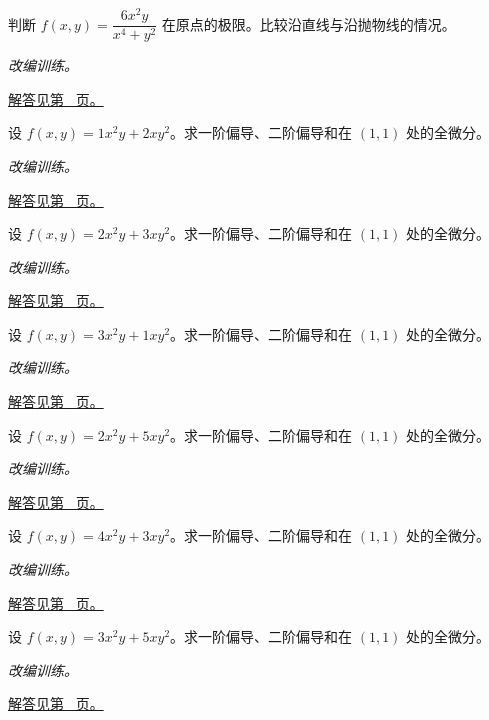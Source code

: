 \documentclass[UTF8,12pt,a4paper,fontset=fandol]{ctexart}
\begin{document}
\begin{example}[直线路径一致仍可能无极限]\label{ex:c32q13}
判断 $f(x,y)=\dfrac{6x^2y}{x^4+y^2}$ 在原点的极限。比较沿直线与沿抛物线的情况。
\par\textit{改编训练。}\par\hyperref[ans:c32q13]{解答见第~\pageref{ans:c32q13} 页。}
\end{example}
\begin{example}[二元多项式的偏导与全微分]\label{ex:c32q14}
设 $f(x,y)=1x^2y+2xy^2$。求一阶偏导、二阶偏导和在 $(1,1)$ 处的全微分。
\par\textit{改编训练。}\par\hyperref[ans:c32q14]{解答见第~\pageref{ans:c32q14} 页。}
\end{example}
\begin{example}[二元多项式的偏导与全微分]\label{ex:c32q15}
设 $f(x,y)=2x^2y+3xy^2$。求一阶偏导、二阶偏导和在 $(1,1)$ 处的全微分。
\par\textit{改编训练。}\par\hyperref[ans:c32q15]{解答见第~\pageref{ans:c32q15} 页。}
\end{example}
\begin{example}[二元多项式的偏导与全微分]\label{ex:c32q16}
设 $f(x,y)=3x^2y+1xy^2$。求一阶偏导、二阶偏导和在 $(1,1)$ 处的全微分。
\par\textit{改编训练。}\par\hyperref[ans:c32q16]{解答见第~\pageref{ans:c32q16} 页。}
\end{example}
\begin{example}[二元多项式的偏导与全微分]\label{ex:c32q17}
设 $f(x,y)=2x^2y+5xy^2$。求一阶偏导、二阶偏导和在 $(1,1)$ 处的全微分。
\par\textit{改编训练。}\par\hyperref[ans:c32q17]{解答见第~\pageref{ans:c32q17} 页。}
\end{example}
\begin{example}[二元多项式的偏导与全微分]\label{ex:c32q18}
设 $f(x,y)=4x^2y+3xy^2$。求一阶偏导、二阶偏导和在 $(1,1)$ 处的全微分。
\par\textit{改编训练。}\par\hyperref[ans:c32q18]{解答见第~\pageref{ans:c32q18} 页。}
\end{example}
\begin{example}[二元多项式的偏导与全微分]\label{ex:c32q19}
设 $f(x,y)=3x^2y+5xy^2$。求一阶偏导、二阶偏导和在 $(1,1)$ 处的全微分。
\par\textit{改编训练。}\par\hyperref[ans:c32q19]{解答见第~\pageref{ans:c32q19} 页。}
\end{example}
\end{document}
